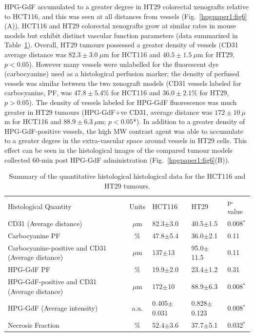 HPG-GdF accumulated to a greater degree in HT29 colorectal xenografts relative to HCT116, and this was seen at all distances from vessels (Fig.~\ref{hpgpaper1:fig6}(A)).
HCT116 and HT29 colorectal xenografts grow at similar rates in mouse models but exhibit distinct vascular function parameters (data summarized in Table~\ref{hpgpaper:table1}).
Overall, HT29 tumours possessed a greater density of vessels (\acs{CD31} average distance was $82.3\pm 3.0~\mu$m for HCT116 and $40.5\pm 1.5~\mu$m for HT29, $p<0.05$).
However many vessels were unlabelled for the fluorescent dye (carbocyanine) used as a histological perfusion marker; the density of perfused vessels was similar between the two xenograft models (\acs{CD31} vessels labeled for carbocyanine, PF, was $47.8\pm 5.4$\% for HCT116 and $36.0\pm 2.1$\% for HT29, $p>0.05$).
The density of vessels labeled for \acs{HPG-GdF} fluorescence was much greater in HT29 tumours (HPG-GdF+ve \acs{CD31}, average distance was $172\pm 10~\mu$m for HCT116 and $88.9\pm 6.3~\mu$m; $p < 0.05$*).
In addition to a greater density of \acs{HPG-GdF}-positive vessels, the high \acs{MW} contrast agent was able to accumulate to a greater degree in the extra-vascular space around vessels in HT29 cells.
This effect can be seen in the histological images of the compared tumour models collected 60-min post \acs{HPG-GdF} administration (Fig.~\ref{hpgpaper1:fig6}(B)).

\begin{table}[htbp]
\begin{center}
    \begin{tabular}{@{}p{3.2cm}clll@{}}
    \rowcolor{gray!50}
Histological Quantity & Units & HCT116 & HT29 & p-value  \\
CD31 \newline(Average distance) & $\mu$m & 82.3$\pm$3.0    & 40.5$\pm$1.5    & 0.008$^{*}$ \\
Carbocyanine \acs{PF} & \%                        & 47.8$\pm$5.4    & 36.0$\pm$2.1    & 0.11    \\
Carbocyanine-positive and CD31 (Average distance)                           & $\mu$m               & 137$\pm$13      & 95.0$\pm$11.5   & 0.11    \\
\acs{HPG-GdF} \acs{PF}                        & \%                        & 19.9$\pm$2.0    & 23.4$\pm$1.2    & 0.31    \\
\acs{HPG-GdF}-positive and CD31  (Average distance) & $\mu$m               & 172$\pm$10      & 88.9$\pm$6.3    & 0.008$^{*}$ \\
\acs{HPG-GdF} (Average intensity) & a.u. & 0.405$\pm$0.031 & 0.828$\pm$0.123 & 0.008$^{*}$ \\
Necrosis Fraction                                        & \%                       & 52.4$\pm$3.6    & 37.7$\pm$5.1    & 0.032$^*$ 
\end{tabular}
\caption{Summary of the quantitative histological histological data for the HCT116 and HT29 tumours.}
\label{hpgpaper:table1}
\end{center}
\end{table}

